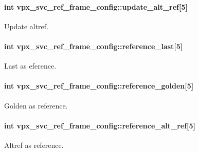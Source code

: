 \paragraph[{\texorpdfstring{update\+\_\+alt\+\_\+ref}{update_alt_ref}}]{\setlength{\rightskip}{0pt plus 5cm}int vpx\+\_\+svc\+\_\+ref\+\_\+frame\+\_\+config\+::update\+\_\+alt\+\_\+ref\mbox{[}5\mbox{]}}\hypertarget{structvpx__svc__ref__frame__config_a2f4ed0250ec58bc3b1faa0d49fbdf436}{}\label{structvpx__svc__ref__frame__config_a2f4ed0250ec58bc3b1faa0d49fbdf436}
Update altref. 
\paragraph[{\texorpdfstring{reference\+\_\+last}{reference_last}}]{\setlength{\rightskip}{0pt plus 5cm}int vpx\+\_\+svc\+\_\+ref\+\_\+frame\+\_\+config\+::reference\+\_\+last\mbox{[}5\mbox{]}}\hypertarget{structvpx__svc__ref__frame__config_a812c764e0bd981b7083d66557595aa09}{}\label{structvpx__svc__ref__frame__config_a812c764e0bd981b7083d66557595aa09}
Last as eference. 
\paragraph[{\texorpdfstring{reference\+\_\+golden}{reference_golden}}]{\setlength{\rightskip}{0pt plus 5cm}int vpx\+\_\+svc\+\_\+ref\+\_\+frame\+\_\+config\+::reference\+\_\+golden\mbox{[}5\mbox{]}}\hypertarget{structvpx__svc__ref__frame__config_a8b61c119c626ec78b29ef52d0def7810}{}\label{structvpx__svc__ref__frame__config_a8b61c119c626ec78b29ef52d0def7810}
Golden as reference. 
\paragraph[{\texorpdfstring{reference\+\_\+alt\+\_\+ref}{reference_alt_ref}}]{\setlength{\rightskip}{0pt plus 5cm}int vpx\+\_\+svc\+\_\+ref\+\_\+frame\+\_\+config\+::reference\+\_\+alt\+\_\+ref\mbox{[}5\mbox{]}}\hypertarget{structvpx__svc__ref__frame__config_aab75feb72ec5cef3c6620765ac52c997}{}\label{structvpx__svc__ref__frame__config_aab75feb72ec5cef3c6620765ac52c997}
Altref as reference. 
